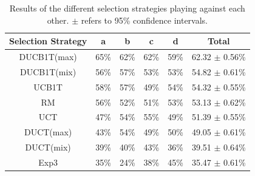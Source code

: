 \documentclass{article}
\begin{document}
\begin{table}
\scriptsize
\begin{minipage}{.53\textwidth}
\begin{tabular}{|c||c|c|c|c|c|}
									\hline
 Selection Strategy	& a 		  & b 		  & c 		  & d 		  & Total 	\\ \hline
 DUCB1T(max) & 65\% & 62\% & 62\% & 59\% & 62.32 $\pm$ 0.56\% \\ \hline
 DUCB1T(mix) & 56\% & 57\% & 53\% & 53\% & 54.82 $\pm$ 0.61\% \\ \hline
 UCB1T & 58\% & 57\% & 49\% & 54\% & 54.32 $\pm$ 0.55\% \\ \hline
        RM & 56\% & 52\% & 51\% & 53\% & 53.13 $\pm$ 0.62\% \\ \hline
   UCT & 47\% & 54\% & 55\% & 49\% & 51.39 $\pm$ 0.55\% \\ \hline
   DUCT(max) & 43\% & 54\% & 49\% & 50\% & 49.05 $\pm$ 0.61\% \\ \hline
   DUCT(mix) & 39\% & 40\% & 43\% & 36\% & 39.51 $\pm$ 0.64\% \\ \hline
      Exp3 & 35\% & 24\% & 38\% & 45\% & 35.47 $\pm$ 0.61\% \\ \hline
\end{tabular}
\caption{Results of the different selection strategies playing against each other. $\pm$ refers to 95\% confidence intervals.}
\end{minipage}
~~~
\begin{minipage}{.4\textwidth}
\scriptsize

\end{minipage}
\end{table}
\end{document}
